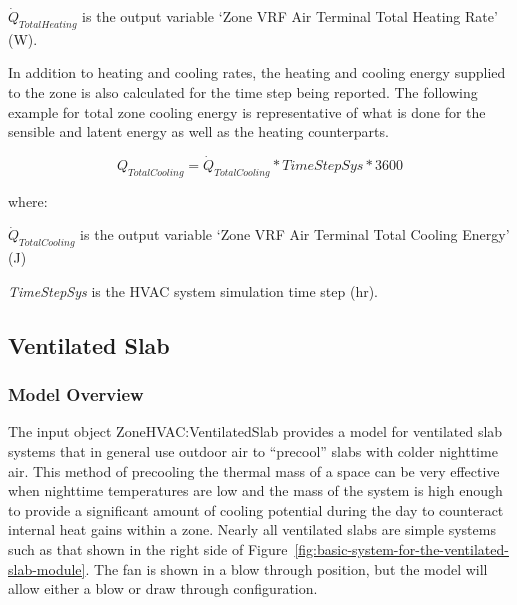 \(\dot{Q}_{TotalHeating}\) is the output variable `Zone VRF Air Terminal Total Heating Rate' (W).

In addition to heating and cooling rates, the heating and cooling energy supplied to the zone is also calculated for the time step being reported. The following example for total zone cooling energy is representative of what is done for the sensible and latent energy as well as the heating counterparts.

\begin{equation}
  Q_{TotalCooling} = \dot{Q}_{TotalCooling} * TimeStepSys * 3600
\end{equation}

where:

\(\dot{Q}_{TotalCooling}\) is the output variable `Zone VRF Air Terminal Total Cooling Energy' (J)

\emph{TimeStepSys} is the HVAC system simulation time step (hr).

\subsection{Ventilated Slab}\label{ventilated-slab}

\subsubsection{Model Overview}\label{model-overview}

The input object ZoneHVAC:VentilatedSlab provides a model for ventilated slab systems that in general use outdoor air to ``precool'' slabs with colder nighttime air. This method of precooling the thermal mass of a space can be very effective when nighttime temperatures are low and the mass of the system is high enough to provide a significant amount of cooling potential during the day to counteract internal heat gains within a zone. Nearly all ventilated slabs are simple systems such as that shown in the right side of Figure~\ref{fig:basic-system-for-the-ventilated-slab-module}. The fan is shown in a blow through position, but the model will allow either a blow or draw through configuration.

